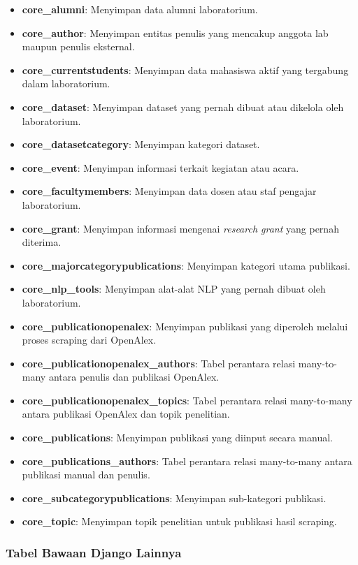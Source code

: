 \begin{itemize}
    \item \textbf{core\_alumni}: Menyimpan data alumni laboratorium.
    \item \textbf{core\_author}: Menyimpan entitas penulis yang mencakup anggota lab maupun penulis eksternal.
    \item \textbf{core\_currentstudents}: Menyimpan data mahasiswa aktif yang tergabung dalam laboratorium.
    \item \textbf{core\_dataset}: Menyimpan dataset yang pernah dibuat atau dikelola oleh laboratorium.
    \item \textbf{core\_datasetcategory}: Menyimpan kategori dataset.
    \item \textbf{core\_event}: Menyimpan informasi terkait kegiatan atau acara.
    \item \textbf{core\_facultymembers}: Menyimpan data dosen atau staf pengajar laboratorium.
    \item \textbf{core\_grant}: Menyimpan informasi mengenai \textit{research grant} yang pernah diterima.
    \item \textbf{core\_majorcategorypublications}: Menyimpan kategori utama publikasi.
    \item \textbf{core\_nlp\_tools}: Menyimpan alat-alat NLP yang pernah dibuat oleh laboratorium.
    \item \textbf{core\_publicationopenalex}: Menyimpan publikasi yang diperoleh melalui proses scraping dari OpenAlex.
    \item \textbf{core\_publicationopenalex\_authors}: Tabel perantara relasi many-to-many antara penulis dan publikasi OpenAlex.
    \item \textbf{core\_publicationopenalex\_topics}: Tabel perantara relasi many-to-many antara publikasi OpenAlex dan topik penelitian.
    \item \textbf{core\_publications}: Menyimpan publikasi yang diinput secara manual.
    \item \textbf{core\_publications\_authors}: Tabel perantara relasi many-to-many antara publikasi manual dan penulis.
    \item \textbf{core\_subcategorypublications}: Menyimpan sub-kategori publikasi.
    \item \textbf{core\_topic}: Menyimpan topik penelitian untuk publikasi hasil scraping.
\end{itemize}

\subsubsection*{Tabel Bawaan Django Lainnya}

